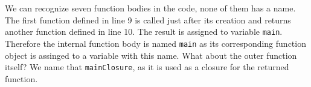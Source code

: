 \documentclass[10pt, preprint]{sigplanconf}
\begin{document}
    We can recognize seven function bodies in the code, none of them has a name. The first function defined in line 9 is called just after its creation and returns another function defined in line 10. The result is assigned to variable {\small\texttt{main}}. Therefore the internal function body is named {\small\texttt{main}} as its corresponding function object is assinged to a variable with this name. What about the outer function itself? We name that
 {\small\texttt{mainClosure}}, as it is used as a closure for the returned function. 
 
 
 
    

   
\begin{table}
\centering
\caption{Different cases of function object creation and usage in JavaScript.}
\end{table}
\end{document}
